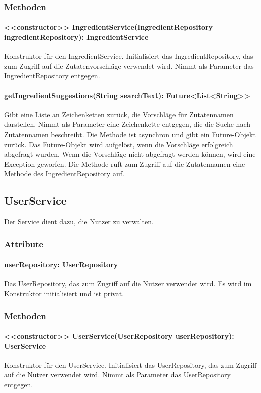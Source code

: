 \documentclass[parskip=full]{scrartcl}
\begin{document}
\subsubsection{Methoden}
\paragraph{<<constructor>> IngredientService(IngredientRepository ingredientRepository): IngredientService}
Konstruktor für den IngredientService. Initialisiert das IngredientRepository, das zum Zugriff auf die Zutatenvorschläge verwendet wird. Nimmt als Parameter das IngredientRepository entgegen.
\paragraph{getIngredientSuggestions(String searchText): Future<List<String>>}
Gibt eine Liste an Zeichenketten zurück, die Vorschläge für Zutatennamen darstellen. Nimmt als Parameter eine Zeichenkette entgegen, die die Suche nach Zutatennamen beschreibt. Die Methode ist asynchron und gibt ein Future-Objekt zurück. Das Future-Objekt wird aufgelöst, wenn die Vorschläge erfolgreich abgefragt wurden. Wenn die Vorschläge nicht abgefragt werden können, wird eine Exception geworfen. Die Methode ruft zum Zugriff auf die Zutatennamen eine Methode des IngredientRepository auf.

\subsection{UserService}
Der Service dient dazu, die Nutzer zu verwalten.
\subsubsection{Attribute}
\paragraph{userRepository: UserRepository}
Das UserRepository, das zum Zugriff auf die Nutzer verwendet wird. Es wird im Konstruktor initialisiert und ist privat.
\subsubsection{Methoden}
\paragraph{<<constructor>> UserService(UserRepository userRepository): UserService}
Konstruktor für den UserService. Initialisiert das UserRepository, das zum Zugriff auf die Nutzer verwendet wird. Nimmt als Parameter das UserRepository entgegen.
\end{document}
